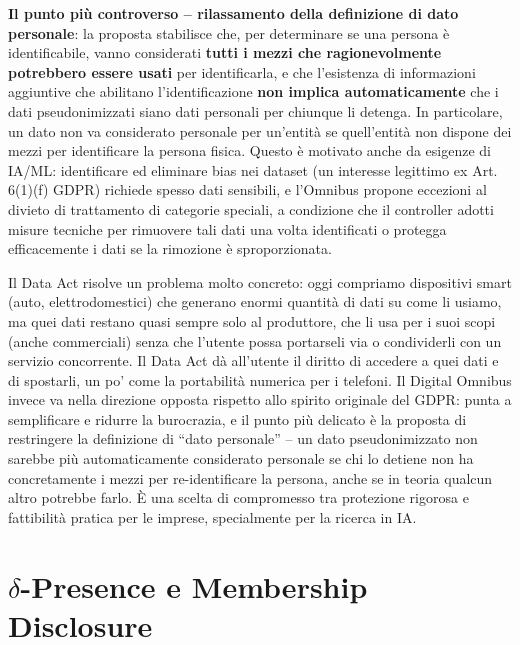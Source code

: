 \documentclass[a4paper,11pt]{article}
\begin{document}
\textbf{Il punto pi\`{u} controverso -- rilassamento della definizione di dato personale}: la proposta stabilisce che, per determinare se una persona \`{e} identificabile, vanno considerati \textbf{tutti i mezzi che ragionevolmente potrebbero essere usati} per identificarla, e che l'esistenza di informazioni aggiuntive che abilitano l'identificazione \textbf{non implica automaticamente} che i dati pseudonimizzati siano dati personali per chiunque li detenga. In particolare, un dato non va considerato personale per un'entit\`{a} se quell'entit\`{a} non dispone dei mezzi per identificare la persona fisica. Questo \`{e} motivato anche da esigenze di IA/ML: identificare ed eliminare bias nei dataset (un interesse legittimo ex Art. 6(1)(f) GDPR) richiede spesso dati sensibili, e l'Omnibus propone eccezioni al divieto di trattamento di categorie speciali, a condizione che il controller adotti misure tecniche per rimuovere tali dati una volta identificati o protegga efficacemente i dati se la rimozione \`{e} sproporzionata.

\begin{nota}
Il Data Act risolve un problema molto concreto: oggi compriamo dispositivi smart (auto, elettrodomestici) che generano enormi quantit\`{a} di dati su come li usiamo, ma quei dati restano quasi sempre solo al produttore, che li usa per i suoi scopi (anche commerciali) senza che l'utente possa portarseli via o condividerli con un servizio concorrente. Il Data Act d\`{a} all'utente il diritto di accedere a quei dati e di spostarli, un po' come la portabilit\`{a} numerica per i telefoni. Il Digital Omnibus invece va nella direzione opposta rispetto allo spirito originale del GDPR: punta a semplificare e ridurre la burocrazia, e il punto pi\`{u} delicato \`{e} la proposta di restringere la definizione di ``dato personale'' -- un dato pseudonimizzato non sarebbe pi\`{u} automaticamente considerato personale se chi lo detiene non ha concretamente i mezzi per re-identificare la persona, anche se in teoria qualcun altro potrebbe farlo. \`{E} una scelta di compromesso tra protezione rigorosa e fattibilit\`{a} pratica per le imprese, specialmente per la ricerca in IA.
\end{nota}

\section{$\delta$-Presence e Membership Disclosure}
\end{document}
